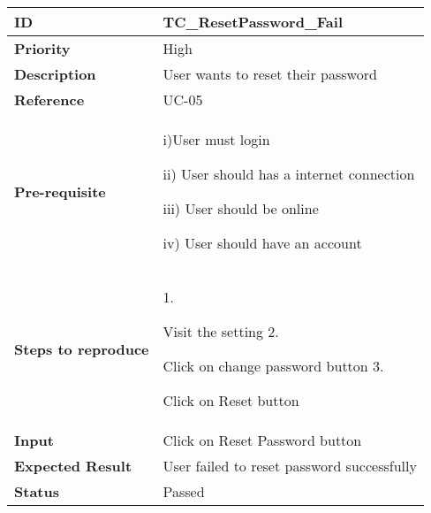 \begin{center}
    \begin{tabularx}{\textwidth}{|l|X|}
        \hline
        \textbf{ID}                 & TC\_ResetPassword\_Fail                    \\
        \hline
        \textbf{Priority}           & High                                       \\
        \hline
        \textbf{Description}        & User wants to reset their password         \\
        \hline
        \textbf{Reference}          & UC-05                                      \\
        \hline
        \textbf{Pre-requisite}      & i)User must login

        ii) User should has a internet connection

        iii) User should be online

        iv) User should have an account                                          \\
        \hline
        \textbf{Steps to reproduce} & 1.

        Visit the setting 2.

        Click on change password button 3.

        Click on Reset button                                                    \\
        \hline
        \textbf{Input}              & Click on Reset Password button             \\
        \hline
        \textbf{Expected Result}    & User failed to reset password successfully \\
        \hline
        \textbf{Status}             & Passed                                     \\
        \hline
    \end{tabularx}
\end{center}
\newpage


